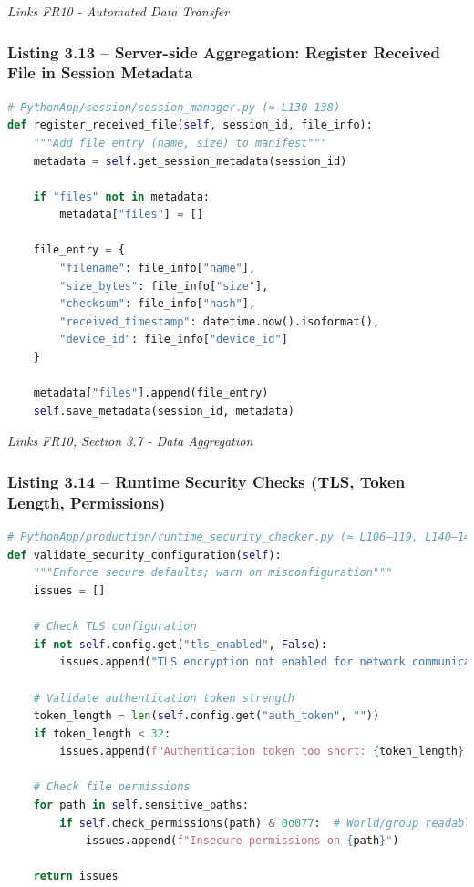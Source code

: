 \documentclass[12pt,a4paper]{article}
\begin{document}
\emph{Links FR10 - Automated Data Transfer}

\subsubsection{Listing 3.13 -- Server-side Aggregation: Register Received File in Session Metadata}\label{listing-3.13-server-side-aggregation-register-received-file-in-session-metadata}

\begin{lstlisting}[language=Python]
# PythonApp/session/session_manager.py (≈ L130–138)
def register_received_file(self, session_id, file_info):
    """Add file entry (name, size) to manifest"""
    metadata = self.get_session_metadata(session_id)
    
    if "files" not in metadata:
        metadata["files"] = []
    
    file_entry = {
        "filename": file_info["name"],
        "size_bytes": file_info["size"],
        "checksum": file_info["hash"],
        "received_timestamp": datetime.now().isoformat(),
        "device_id": file_info["device_id"]
    }
    
    metadata["files"].append(file_entry)
    self.save_metadata(session_id, metadata)
\end{lstlisting}

\emph{Links FR10, Section 3.7 - Data Aggregation}

\subsubsection{Listing 3.14 -- Runtime Security Checks (TLS, Token Length, Permissions)}\label{listing-3.14-runtime-security-checks-tls-token-length-permissions}

\begin{lstlisting}[language=Python]
# PythonApp/production/runtime_security_checker.py (≈ L106–119, L140–148, L156–171)
def validate_security_configuration(self):
    """Enforce secure defaults; warn on misconfiguration"""
    issues = []
    
    # Check TLS configuration
    if not self.config.get("tls_enabled", False):
        issues.append("TLS encryption not enabled for network communication")
    
    # Validate authentication token strength
    token_length = len(self.config.get("auth_token", ""))
    if token_length < 32:
        issues.append(f"Authentication token too short: {token_length} chars (min: 32)")
    
    # Check file permissions
    for path in self.sensitive_paths:
        if self.check_permissions(path) & 0o077:  # World/group readable
            issues.append(f"Insecure permissions on {path}")
    
    return issues
\end{lstlisting}
\end{document}
